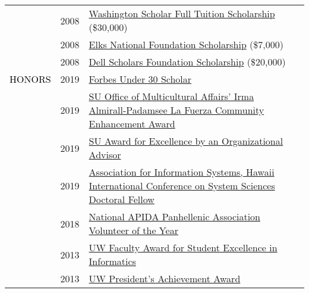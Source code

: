 \documentclass[12pt]{article}
\begin{document}
{{\begin{longtable}{Rp{1.0in}p{0.25in}p{4.75in}}
& \footnotesize{2008} & \href{https://www.wsac.wa.gov/}{{Washington Scholar Full Tuition Scholarship}} (\$30,000) \\

& \footnotesize{2008} & \href{https://www.elks.org/enf/scholars/}{{Elks National Foundation Scholarship}} (\$7,000) \\

& \footnotesize{2008} & \href{https://www.dellscholars.org/}{{Dell Scholars Foundation Scholarship}} (\$20,000) \\

\textcolor{black}{\footnotesize{\uppercase{Honors}}} 
& \footnotesize{2019} & 
\href{https://www.forbes.com/sites/forbespr/2017/09/12/forbes-under-30-scholars-program-focused-on-diversity-and-inclusion-offers-1000-college-students-access-to-2017-forbes-under-30-summit/}{{Forbes Under 30 Scholar}} \\

& \footnotesize{2019} & 
\href{https://news.syr.edu/blog/2019/04/29/44-stars-of-excellence-awards-honor-members-of-campus-community/}{{SU Office of Multicultural Affairs' Irma Almirall-Padamsee La Fuerza Community Enhancement Award}} \\

& \footnotesize{2019} &\href{https://news.syr.edu/blog/2019/04/29/44-stars-of-excellence-awards-honor-members-of-campus-community/}{{SU Award for Excellence by an Organizational Advisor}} \\

& \footnotesize{2019} &
\href{https://twitter.com/bdosono/status/1082439167512961024}{{Association for Information Systems, Hawaii International Conference on System Sciences Doctoral Fellow}} \\

& \footnotesize{2018} &
\href{http://www.napahq.org/2018-napa-standards-of-excellence-award-recipients/}{{National APIDA Panhellenic Association Volunteer of the Year}} \\

& \footnotesize{2013} & \href{https://ischool.uw.edu/news/2016/12/2013-ischool-convocation-celebrates-achievement-and-community}{{UW Faculty Award for Student Excellence in Informatics}} \\

& \footnotesize{2013} & \href{https://www.washington.edu/omad/celebration/recognition-scholarship-recipients/2013-celebration-scholarship-recipients/}{{UW President's Achievement Award}} \\


\end{longtable}}}
\end{document}
